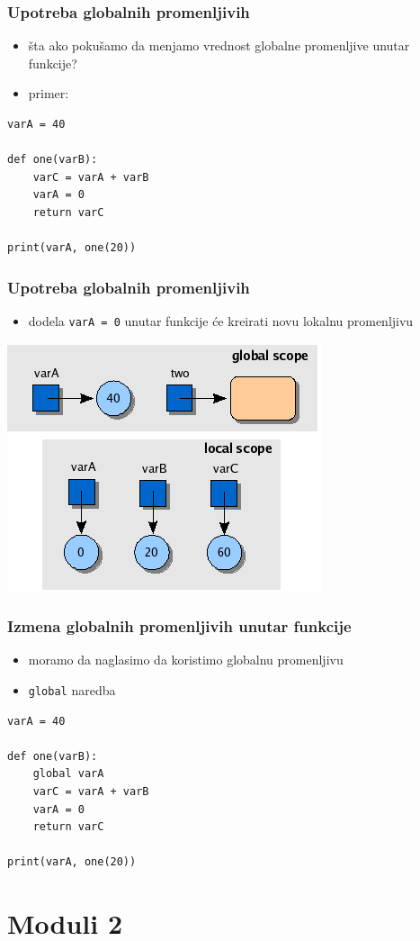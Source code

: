 \documentclass[compress]{beamer}
\begin{document}
\begin{frame}[fragile]
\frametitle{Upotreba globalnih promenljivih}
\begin{itemize}
  \item šta ako pokušamo da menjamo vrednost globalne promenljive unutar funkcije?
  \item primer:
\end{itemize}
\begin{verbatim}
varA = 40

def one(varB):
    varC = varA + varB
    varA = 0
    return varC

print(varA, one(20))
\end{verbatim}
\end{frame}

\begin{frame}[fragile]
\frametitle{Upotreba globalnih promenljivih}
\begin{itemize}
  \item dodela \texttt{varA = 0} unutar funkcije će kreirati novu lokalnu promenljivu
\end{itemize}
\begin{center}
  \includegraphics[scale=0.7]{globalvar.png}
\end{center}
\end{frame}

\begin{frame}[fragile]
\frametitle{Izmena globalnih promenljivih unutar funkcije}
\begin{itemize}
  \item moramo da naglasimo da koristimo globalnu promenljivu
  \item \texttt{global} naredba
\end{itemize}
\begin{verbatim}
varA = 40

def one(varB):
    global varA
    varC = varA + varB
    varA = 0
    return varC

print(varA, one(20))
\end{verbatim}
\end{frame}

\section{Moduli 2}
\end{document}
